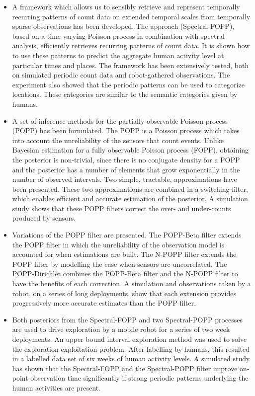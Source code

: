 \begin{itemize}
    \item A framework which allows us to sensibly retrieve and represent temporally recurring patterns of count data on extended temporal scales from temporally sparse observations has been developed. The approach (Spectral-FOPP), based on a time-varying Poisson process in combination with spectral analysis, efficiently retrieves recurring patterns of count data. It is shown how to use these patterns to predict the aggregate human activity level at particular times and places. The framework has been extensively tested, both on simulated periodic count data and robot-gathered observations. The experiment also showed that the periodic patterns can be used to categorize locations. These categories are similar to the semantic categories given by humans. 
    \item A set of inference methods for the partially observable Poisson process (POPP) has been formulated. The POPP is a Poisson process which takes into account the unreliability of the sensors that count events. Unlike Bayesian estimation for a fully observable Poisson process (FOPP), obtaining the posterior is non-trivial, since there is no conjugate density for a POPP and the posterior has a number of elements that grow exponentially in the number of observed intervals. Two simple, tractable, approximations have been presented. These two approximations are combined in a switching filter, which enables efficient and accurate estimation of the posterior. A simulation study shows that these POPP filters correct the over- and under-counts produced by sensors.  
    \item Variations of the POPP filter are presented. The POPP-Beta filter extends the POPP filter in which the unreliability of the observation model is accounted for when estimations are built. The N-POPP filter extends the POPP filter by modelling the case when sensors are uncorrelated. The POPP-Dirichlet combines the POPP-Beta filter and the N-POPP filter to have the benefits of each correction. A simulation and observations taken by a robot, on a series of long deployments, show that each extension provides progressively more accurate estimates than the POPP filter.  
    \item Both posteriors from the Spectral-FOPP and two Spectral-POPP processes are used to drive exploration by a mobile robot for a series of two week deployments. An upper bound interval exploration method was used to solve the exploration-exploitation problem. After labelling by humans, this resulted in a labelled data set of six weeks of human activity levels. A simulated study has shown that the Spectral-FOPP and the Spectral-POPP filter improve on-point observation time significantly if strong periodic patterns underlying the human activities are present. 
\end{itemize}
        
